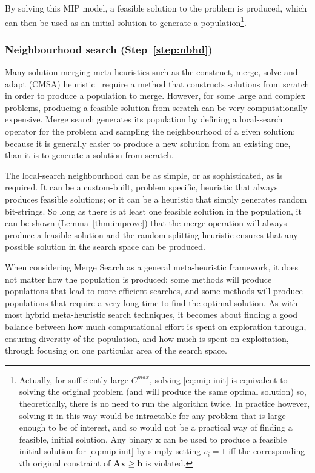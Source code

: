 \documentclass[authoryear,11pt,square,number,times,super,comma]{elsarticle}
\newcommand{\V}[1]{\ensuremath{\boldsymbol{#1}}}
\newcommand{\M}[1]{\ensuremath{\boldsymbol{#1}}}
\begin{document}
By solving this MIP model, a feasible solution to the problem is produced, which can then be used as an initial solution to generate a population\footnote{Actually, for sufficiently large \(C^{max}\), solving \eqref{eq:mip-init} is equivalent to solving the original problem (and will produce the same optimal solution) so, theoretically, there is no need to run the algorithm twice. In practice however, solving it in this way would be intractable for any problem that is large enough to be of interest, and so would not be a practical way of finding a feasible, initial solution. Any binary \(\V{x}\) can be used to produce a feasible initial solution for \eqref{eq:mip-init} by simply setting \(v_i=1\) iff the corresponding \(i\)th original constraint of \(\M{A} \V{x} \ge \V{b}\) is violated.}.

\subsubsection*{Neighbourhood search (Step~\ref{step:nbhd})}

Many solution merging meta-heuristics such as the construct, merge, solve and adapt (CMSA) heuristic~\citet{Blum2016} require a method that constructs solutions from scratch in order to produce a population to merge. However, for some large and complex problems, producing a feasible solution from scratch can be very computationally expensive. Merge search generates its population by defining a local-search operator for the problem and sampling the neighbourhood of a given solution; because it is generally easier to produce a new solution from an existing one, than it is to generate a solution from scratch. 

The local-search neighbourhood can be as simple, or as sophisticated, as is required. It can be a custom-built, problem specific, heuristic that always produces feasible solutions; or it can be a heuristic that simply generates random bit-strings. So long as there is at least one feasible solution in the population, it can be shown (Lemma~\ref{thm:improve}) that the merge operation will always produce a feasible solution and the random splitting heuristic ensures that any possible solution in the search space can be produced.

When considering Merge Search as a general meta-heuristic framework, it does not matter how the population is produced; some methods will produce populations that lead to more efficient searches, and some methods will produce populations that require a very long time to find the optimal solution. As with most hybrid meta-heuristic search techniques, it becomes about finding a good balance between how much computational effort is spent on exploration through, ensuring diversity of the population, and how much is spent on exploitation, through focusing on one particular area of the search space.
\end{document}
